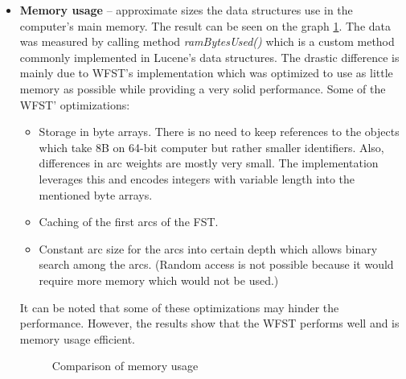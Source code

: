 \begin{itemize}
    \item \textbf{Memory usage} – approximate sizes the data structures use in the computer's main memory.
     The result can be seen on the graph \ref{comp_mem}. The data was measured by calling method
     \textit{ramBytesUsed()} which is a custom method commonly implemented in Lucene's data structures.
     The drastic
    difference is mainly due to WFST's implementation which was optimized to use as little memory as possible while
    providing a very solid performance. Some of the WFST' optimizations:
    \begin{itemize}
        \item Storage in byte arrays. There is no need to keep references to the objects which take 8B on 64-bit computer
        but rather smaller identifiers. Also, differences in arc weights are mostly very small. The implementation
        leverages this and encodes integers with variable length into the mentioned byte arrays.
        \item Caching of the first arcs of the FST.
        \item Constant arc size for the arcs into certain depth which allows binary search among the arcs. (Random
        access is not possible because it would require more memory which would not be used.)
    \end{itemize}
    It can be noted that some of these optimizations may hinder the performance. However, the results show that the WFST
    performs well and is memory usage efficient.

    \begin{figure}[htbp]
        \centering
        \caption{Comparison of memory usage}
        \label{comp_mem}
    \end{figure}

\end{itemize}

